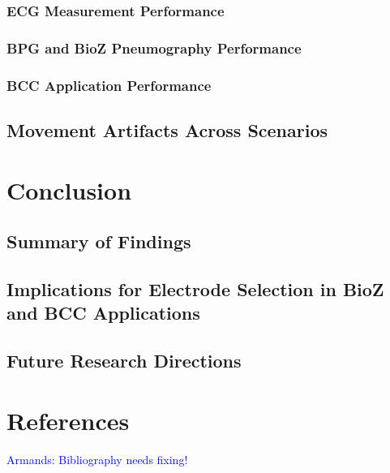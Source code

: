 \documentclass[conference]{IEEEtran}
\newcommand{\notea}[1]{\textcolor{blue}{Armands: #1}}
\begin{document}
\subsubsection{ECG Measurement Performance}
\subsubsection{BPG and BioZ Pneumography Performance}
\subsubsection{BCC Application Performance}
\subsection{Movement Artifacts Across Scenarios}

\section{Conclusion}
\subsection{Summary of Findings}
\subsection{Implications for Electrode Selection in BioZ and BCC Applications}
\subsection{Future Research Directions}

\section*{References}
\notea{Bibliography needs fixing!}

% 
% 
\end{document}
